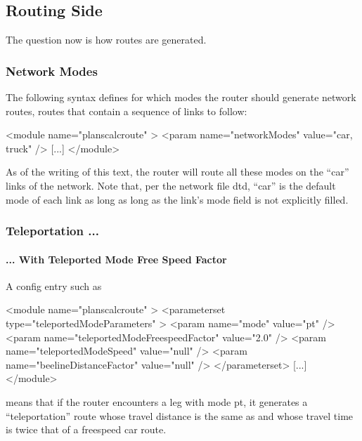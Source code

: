 \subsection{Routing Side}
The question now is how routes are generated.

\subsubsection{Network Modes}
\label{sec:network-modes}
The following syntax defines for which modes the router should generate network routes, \ie routes that contain a sequence of links to follow:
\begin{xml}
<module name="planscalcroute" >
   <param name="networkModes" value="car, truck" />
   [...]
</module>
\end{xml}
As of the writing of this text, the router will route all these modes on the ``car'' links of the network.  Note that, per the network file \gls{dtd}, ``car'' is the default mode of each link as long as long as the link's mode field is not explicitly filled.




\subsubsection{Teleportation ...}
\paragraph{... With Teleported Mode Free Speed Factor}
A config entry such as
\begin{xml}
<module name="planscalcroute" >
   <parameterset type="teleportedModeParameters" >
      <param name="mode" value="pt" />
      <param name="teleportedModeFreespeedFactor" value="2.0" />
      <param name="teleportedModeSpeed" value="null" />
      <param name="beelineDistanceFactor" value="null" />
   </parameterset>
   [...]   
</module>      
\end{xml}
means that if the router encounters a leg with mode pt, it generates a ``teleportation'' route whose travel distance is the same as and whose travel time is twice that of a freespeed car route.


